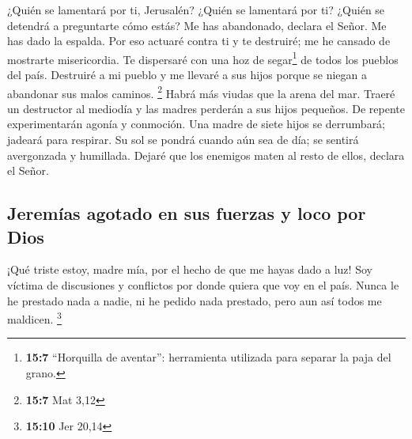  ¿Quién se lamentará por ti, Jerusalén? ¿Quién se
lamentará por ti? ¿Quién se detendrá a preguntarte cómo estás?
 Me has abandonado, declara el Señor. Me has dado la
espalda. Por eso actuaré contra ti y te destruiré; me he cansado de
mostrarte misericordia.  Te dispersaré con una hoz de
segar\footnote{\textbf{15:7} ``Horquilla de aventar'': herramienta
  utilizada para separar la paja del grano.} de todos los pueblos del
país. Destruiré a mi pueblo y me llevaré a sus hijos porque se niegan a
abandonar sus malos caminos. \footnote{\textbf{15:7} Mat 3,12}
 Habrá más viudas que la arena del mar. Traeré un
destructor al mediodía y las madres perderán a sus hijos pequeños. De
repente experimentarán agonía y conmoción.  Una madre de
siete hijos se derrumbará; jadeará para respirar. Su sol se pondrá
cuando aún sea de día; se sentirá avergonzada y humillada. Dejaré que
los enemigos maten al resto de ellos, declara el Señor.

\hypertarget{jeremuxedas-agotado-en-sus-fuerzas-y-loco-por-dios}{%
\subsection{Jeremías agotado en sus fuerzas y loco por
Dios}\label{jeremuxedas-agotado-en-sus-fuerzas-y-loco-por-dios}}

 ¡Qué triste estoy, madre mía, por el hecho de que me
hayas dado a luz! Soy víctima de discusiones y conflictos por donde
quiera que voy en el país. Nunca le he prestado nada a nadie, ni he
pedido nada prestado, pero aun así todos me maldicen. \footnote{\textbf{15:10}
  Jer 20,14}

